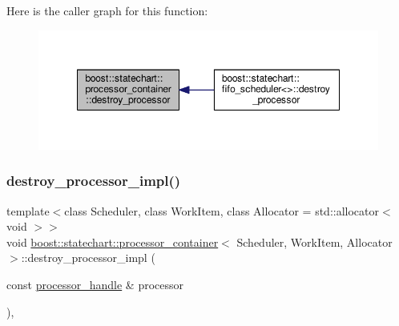 Here is the caller graph for this function\+:
\nopagebreak
\begin{figure}[H]
\begin{center}
\leavevmode
\includegraphics[width=348pt]{classboost_1_1statechart_1_1processor__container_aa6a671334e57fdb6b99946907c292cb6_icgraph}
\end{center}
\end{figure}
\mbox{\label{classboost_1_1statechart_1_1processor__container_a50b4db6dac9debb3b9e9e50f25af74f3}} 
\subsubsection{\texorpdfstring{destroy\+\_\+processor\+\_\+impl()}{destroy\_processor\_impl()}}
{\footnotesize\ttfamily template$<$class Scheduler, class Work\+Item, class Allocator = std\+::allocator$<$ void $>$$>$ \\
void \mbox{\hyperlink{classboost_1_1statechart_1_1processor__container}{boost\+::statechart\+::processor\+\_\+container}}$<$ Scheduler, Work\+Item, Allocator $>$\+::destroy\+\_\+processor\+\_\+impl (\begin{DoxyParamCaption}\item[{const \mbox{\hyperlink{classboost_1_1statechart_1_1processor__container_a82ebbffaed81d7b99119ae0e892f6411}{processor\+\_\+handle}} \&}]{processor }\end{DoxyParamCaption})\hspace{0.3cm}{\ttfamily [inline]}, {\ttfamily [private]}}

